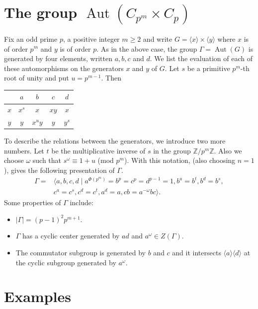\documentclass[12pt]{article}
\theoremstyle{plain}
\theoremstyle{definition}
\newcommand{\Aut}{\operatorname{Aut}}
\begin{document}
\section{The group $\Aut(C_{p^m}\times C_p)$}\label{appB}
Fix an odd prime $p$, a positive integer $m\ge 2$ and write $G =\langle x\rangle \times \langle y\rangle$ where $x$ is of order $p^m$ and $y$ is of order $p$. 
As in the above case, the group $\Gamma= \Aut(G)$ is generated by four elements, written $a, b, c$ and $d$. We list the evaluation of each of these automorphisms on the generators $x$ and $y$ of $G$. Let $s$ be a primitive $p^m$-th root of unity and put $u = p^{m-1}$. Then
\begin{center}
    \begin{tabular}{c|cccc}
         & $a$ & $b$ & $c$ & $d$ \\ \hline
         $x$ & $x^{s}$ & $x$ & $xy$ & $x$\\
         $y$ & $y$ & $x^uy$ & $y$ & $y^s$\\
    \end{tabular}
\end{center}
To describe the relations between the generators, we introduce two more numbers. Let $t$ be the multiplicative inverse of $s$ in the group $\mathbb Z/p^m\mathbb Z$. Also we choose $\omega$ such that $s^\omega \equiv 1 + u$ (mod $p^m$). With this notation, (also choosing $n=1$), \cite[Theorem 2.5]{BC} gives the following presentation of $\Gamma$.
\begin{eqnarray*}
    \Gamma = &\langle a, b, c, d\mid a^{\Phi(p^m)} = b^p = c^p = d^{p-1} =1, b^a = b^t, b^d =b^s, \\ & c^a=c^s, c^d = c^t, a^d = a, cb = a^{-\omega}bc \rangle. 
    \end{eqnarray*}
    Some properties of \(\Gamma\) include:
\begin{itemize}
    \item \(|\Gamma| = (p-1)^2 p^{m+1}\).
    \item \(\Gamma\) has a cyclic center generated by \(ad\) and $a^\omega\in Z(\Gamma)$.
    \item The commutator subgroup is generated by \(b\) and \(c\) and it intersects $\langle a\rangle\langle d\rangle$ at the cyclic subgroup generated by $a^\omega$.
\end{itemize}

\section{Examples}
\end{document}
